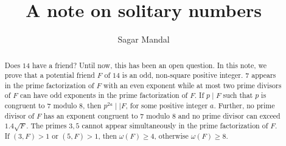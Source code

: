 \documentclass[11pt,twoside]{amsart}
\begin{document}
\title{A note on solitary numbers} %
\author[Sagar Mandal]{Sagar Mandal}
\address{Department of Mathematics and Statistics, Indian Institute of Technology Kanpur\\ Kalyanpur, Kanpur, Uttar Pradesh 208016, India}

\maketitle
\let\thefootnote\relax
{}
\let\thefootnote\relax
{} %
\maketitle

\begin{abstract}

Does $14$ have a friend? Until now, this has been an open question. In this note, we prove that a potential friend $F$ of $14$ is an odd, non-square positive integer. $7$ appears in the prime factorization of $F$ with an even exponent while at most two prime divisors of $F$ can have odd exponents in the prime factorization of $F$. If $p\mid F$ such that $p$ is congruent to $7$ modulo $8$, then $p^{2a}\mid\mid F$, for some positive integer $a$. Further, no prime divisor of $F$ has an exponent  congruent to $7$ modulo $8$ and no prime divisor can exceed $1.4\sqrt{F}$. The primes $3,5$ cannot appear simultaneously  in the prime factorization of $F$. If $(3,F)>1$ or $(5,F)>1$, then $\omega(F)\geq4$, otherwise $\omega(F)\geq8$.




\end{abstract}

\end{document}
